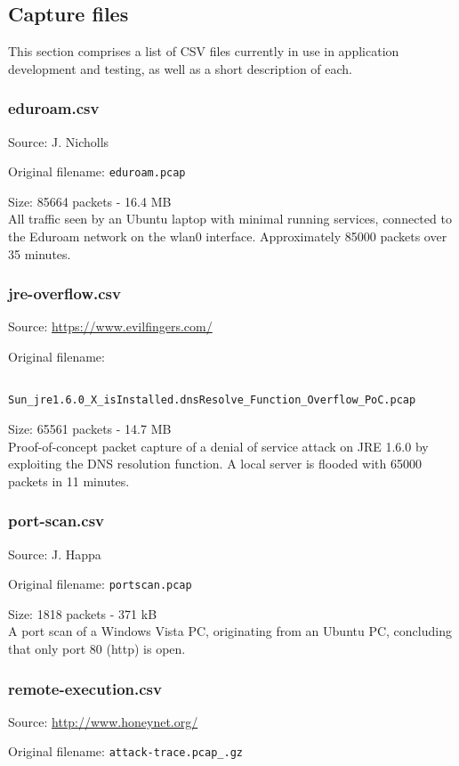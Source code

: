 \documentclass[12pt,a4paper]{article}
\newcommand{\dbl}{\\[\baselineskip]}
\begin{document}
	\pagebreak
	
	\subsection*{Capture files}
	This section comprises a list of CSV files currently in use in
	application development and testing, as well as a short
	description of each.
	
	\subsubsection*{eduroam.csv}
	Source: J. Nicholls
	
	Original filename: \verb!eduroam.pcap!
	
	Size: 85664 packets - 16.4 MB \dbl
	All traffic seen by an Ubuntu laptop with minimal running
	services, connected to the Eduroam network on the wlan0
	interface. Approximately 85000 packets over 35 minutes.
	
	\subsubsection*{jre-overflow.csv}
	Source: \url{https://www.evilfingers.com/}
	
	Original filename:
	
	\verb!        Sun_jre1.6.0_X_isInstalled.dnsResolve_Function_Overflow_PoC.pcap!
	
	Size: 65561 packets - 14.7 MB \dbl
	Proof-of-concept packet capture of a denial of service
	attack on JRE 1.6.0 by exploiting the DNS resolution
	function. A local server is flooded with 65000 packets in
	11 minutes.
	
	\subsubsection*{port-scan.csv}
	Source: J. Happa
	
	Original filename: \verb!portscan.pcap!
	
	Size: 1818 packets - 371 kB \dbl
	A port scan of a Windows Vista PC, originating from an
	Ubuntu PC, concluding that only port 80 (http) is open.
	
	\subsubsection*{remote-execution.csv}
	Source: \url{http://www.honeynet.org/}
	
	Original filename: \verb!attack-trace.pcap_.gz!
	
\end{document}
